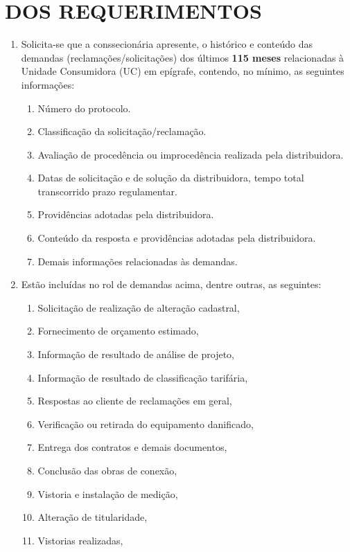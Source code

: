 \section{DOS REQUERIMENTOS}

\begin{enumerate}[resume]

\item Solicita-se que a conssecionária apresente, o histórico e conteúdo das demandas (reclamações/solicitações) dos últimos \textbf{115 meses} relacionadas à Unidade Consumidora (UC) em epígrafe, contendo, no mínimo, as seguintes informações:  
  \begin{enumerate}
    \item Número do protocolo.  
    \item Classificação da solicitação/reclamação.  
    \item Avaliação de procedência ou improcedência realizada pela distribuidora.  
    \item Datas de solicitação e de solução da distribuidora, tempo total transcorrido prazo regulamentar.  
    \item Providências adotadas pela distribuidora.  
    \item Conteúdo da resposta e providências adotadas pela distribuidora.  
    \item Demais informações relacionadas às demandas. 
  \end{enumerate}
\item Estão incluídas no rol de demandas acima, dentre outras, as seguintes:
  \begin{enumerate}
    \item Solicitação de realização de alteração cadastral,
    \item Fornecimento de orçamento estimado,
    \item Informação de resultado de análise de projeto,
    \item Informação de resultado de classificação tarifária,
    \item Respostas ao cliente de reclamações em geral,
    \item Verificação ou retirada do equipamento danificado,
    \item Entrega dos contratos e demais documentos,
    \item Conclusão das obras de conexão,
    \item Vistoria e instalação de medição,
    \item Alteração de titularidade,
    \item Vistorias realizadas,

\end{enumerate}
\end{enumerate}

